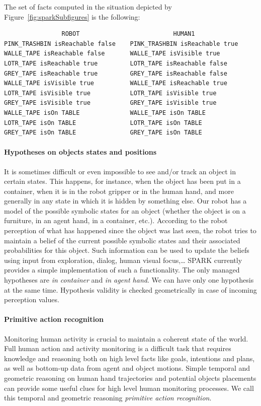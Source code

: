 \documentclass[preprint,12pt]{elsarticle}
\begin{document}
The set of facts computed in the situation depicted by
Figure~\ref{fig:sparkSubfigures} is the following:
\begin{footnotesize}
\begin{verbatim}
                ROBOT                          HUMAN1
PINK_TRASHBIN isReachable false    PINK_TRASHBIN isReachable true 
WALLE_TAPE isReachable false       WALLE_TAPE isVisible true 
LOTR_TAPE isReachable true         LOTR_TAPE isReachable false 
GREY_TAPE isReachable true         GREY_TAPE isReachable false
WALLE_TAPE isVisible true          WALLE_TAPE isReachable true 
LOTR_TAPE isVisible true           LOTR_TAPE isVisible true 
GREY_TAPE isVisible true           GREY_TAPE isVisible true 
WALLE_TAPE isOn TABLE              WALLE_TAPE isOn TABLE 
LOTR_TAPE isOn TABLE               LOTR_TAPE isOn TABLE 
GREY_TAPE isOn TABLE               GREY_TAPE isOn TABLE 
\end{verbatim}
\end{footnotesize}

\paragraph{Hypotheses on objects states and positions}
It is sometimes difficult or even impossible to see and/or track an
object in certain states. This happens, for instance, when the object
has been put in a container, when it is in the robot gripper or in the
human hand, and more generally in any state in which it is hidden by
something else. Our robot has a model of the possible symbolic states
for an object (whether the object is on a furniture, in an agent hand,
in a container, etc.).  According to the robot perception of what has
happened since the object was last seen, the robot tries to maintain a
belief of the current possible symbolic states and their associated
probabilities for this object. Such information can be used to update
the beliefs using input from exploration, dialog, human visual
focus,\ldots
SPARK currently provides a simple implementation of such a functionality. The
only managed hypotheses are \emph{in container} and \emph{in agent hand}. We
can have only one hypothesis at the same time. Hypothesis validity is checked
geometrically in case of incoming perception values.


\paragraph{Primitive action recognition}
Monitoring human activity is crucial to maintain a coherent state of
the world. Full human action and activity monitoring is a difficult
task that requires knowledge and reasoning both on high level facts
like goals, intentions and plans, as well as bottom-up data from agent
and object motions. Simple temporal and geometric reasoning on human
hand trajectories and potential objects placements can provide some
useful clues for high level human monitoring processes. We call this
temporal and geometric reasoning \emph{primitive action recognition}.
\end{document}

